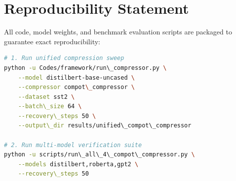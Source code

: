 \section{Reproducibility Statement}
All code, model weights, and benchmark evaluation scripts are packaged to guarantee exact reproducibility:
\begin{lstlisting}[language=bash]
# 1. Run unified compression sweep
python -u Codes/framework/run\_compressor.py \
    --model distilbert-base-uncased \
    --compressor compot\_compressor \
    --dataset sst2 \
    --batch\_size 64 \
    --recovery\_steps 50 \
    --output\_dir results/unified\_compot\_compressor

# 2. Run multi-model verification suite
python -u scripts/run\_all\_4\_compot\_compressor.py \
    --models distilbert,roberta,gpt2 \
    --recovery\_steps 50
\end{lstlisting}
